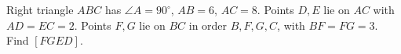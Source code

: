 Right triangle $ABC$ has $\angle A=90^\circ$, $AB=6$, $AC=8$. Points $D,E$ lie on $AC$ with $AD=EC=2$. Points $F,G$ lie on $BC$ in order $B,F,G,C$, with $BF=FG=3$. Find $[FGED]$.
